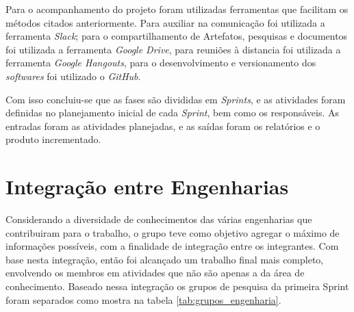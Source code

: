 Para o acompanhamento do projeto foram utilizadas ferramentas que facilitam os métodos citados anteriormente. Para auxiliar na comunicação foi utilizada a ferramenta \textit{Slack}; para o compartilhamento de Artefatos, pesquisas e documentos foi utilizada a ferramenta \textit{Google Drive}, para reuniões à distancia foi utilizada a ferramenta \textit{Google Hangouts}, para o desenvolvimento e versionamento dos \textit{softwares} foi utilizado o \textit{GitHub}.

Com isso concluiu-se que as fases são divididas em \textit{Sprints}, e as atividades foram definidas no planejamento inicial de cada \textit{Sprint}, bem como os responsáveis. As entradas foram as atividades planejadas, e as saídas foram os relatórios e o produto incrementado.

\section{Integração entre Engenharias}

Considerando a diversidade de conhecimentos das várias engenharias que contribuiram para o trabalho, o grupo teve como objetivo agregar o máximo de informações possíveis, com a finalidade de integração entre os integrantes. Com base nesta integração, então foi alcançado um trabalho final mais completo, envolvendo os membros em atividades que não são apenas a da área de conhecimento. Baseado nessa integração os grupos de pesquisa da primeira Sprint foram separados como mostra na tabela \ref{tab:grupos_engenharia}.

\begin{table}[!h]
\centering
{}
\caption{My caption}
\label{tab:grupos_engenharia}
\end{table}

